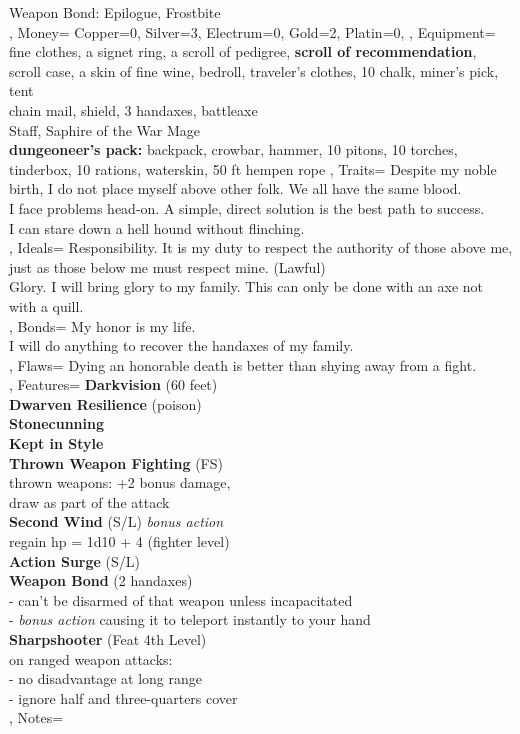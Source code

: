 \documentclass[10pt,a4paper]{scrbook}
\begin{document}
{{{				Weapon Bond: Epilogue, Frostbite\\
			}
		},
		Money={
			Copper=0,
			Silver=3,
			Electrum=0,
			Gold=2,
			Platin=0,
		},
		Equipment={
			fine clothes, a signet ring, a scroll of pedigree, \textbf{scroll of recommendation}, scroll case, a skin of fine wine, bedroll, traveler's clothes, 10 chalk, miner's pick, tent\\
			chain mail, shield, 3 handaxes, battleaxe\\
			Staff, Saphire of the War Mage\\
			\textbf{dungeoneer's pack:} backpack, crowbar, hammer, 10 pitons, 10 torches, tinderbox, 10 rations, waterskin, 50 ft hempen rope
		},
		Traits={
			\tiny
			Despite my noble birth, I do not place myself above other folk. We all have the same blood.\\
			I face problems head-on. A simple, direct solution is the best path to success.\\
			I can stare down a hell hound without flinching.\\
		},
		Ideals={
			\tiny
			Responsibility. It is my duty to respect the authority of those above me, just as those below me must respect mine. (Lawful)\\
			Glory. I will bring glory to my family. This can only be done with an axe not with a quill.\\
		},
		Bonds={
			My honor is my life.\\
			I will do anything to recover the handaxes of my family.\\
		},
		Flaws={
			Dying an honorable death is better than shying away from a fight.\\
		},
		Features={
			\textbf{Darkvision} (60 feet)\\
			\textbf{Dwarven Resilience} (poison)\\
			\textbf{Stonecunning}\\
			\textbf{Kept in Style}\\
			\textbf{Thrown Weapon Fighting} (FS)\\
			thrown weapons: +2 bonus damage,\\
			draw as part of the attack\\
			\textbf{Second Wind} (S/L) \textit{bonus action}\\
			regain hp = 1d10 + 4 (fighter level)\\
			\textbf{Action Surge} (S/L)\\
			\textbf{Weapon Bond} (2 handaxes)\\
			- can't be disarmed of that weapon unless incapacitated\\
			- \textit{bonus action} causing it to teleport instantly to your hand\\
			\textbf{Sharpshooter} (Feat 4th Level)\\
			on ranged weapon attacks:\\
			- no disadvantage at long range\\
			- ignore half and three-quarters cover\\
		},
		Notes={
		}
	}
\end{document}
